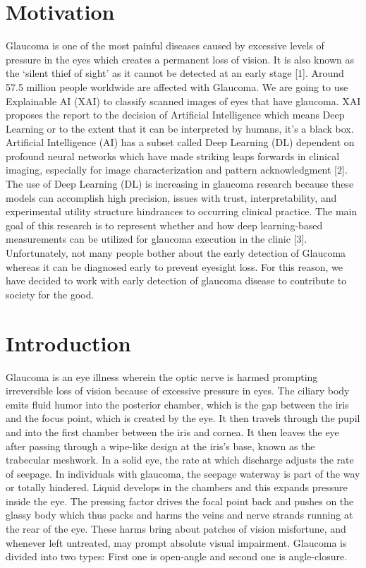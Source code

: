 \section{Motivation} 
Glaucoma is one of the most painful diseases caused by excessive levels of pressure in the eyes which creates a permanent loss of vision. It is also known as the ‘silent thief of sight’ as it cannot be detected at an early stage [1]. Around 57.5 million people worldwide are affected with Glaucoma. We are going to use Explainable AI (XAI) to classify scanned images of eyes that have glaucoma. XAI proposes the report to the decision of Artificial Intelligence which means Deep Learning or to the extent that it can be interpreted by humans, it's a black box. Artificial Intelligence (AI) has a subset called Deep Learning (DL) dependent on profound neural networks which have made striking leaps forwards in clinical imaging, especially for image characterization and pattern acknowledgment [2]. The use of Deep Learning (DL) is increasing in glaucoma research because these models can accomplish high precision, issues with trust, interpretability, and experimental utility structure hindrances to occurring clinical practice. The main goal of this research is to represent whether and how deep learning-based measurements can be utilized for glaucoma execution in the clinic [3]. Unfortunately, not many people bother about the early detection of Glaucoma whereas it can be diagnosed early to prevent eyesight loss. For this reason, we have decided to work with early detection of glaucoma disease to contribute to society for the good.

\section{Introduction}
Glaucoma is an eye illness wherein the optic nerve is harmed prompting irreversible loss of vision because of excessive pressure in eyes. The ciliary body emits fluid humor into the posterior chamber, which is the gap between the iris and the focus point, which is created by the eye. It then travels through the pupil and into the first chamber between the iris and cornea. It then leaves the eye after passing through a wipe-like design at the iris's base, known as the trabecular meshwork. In a solid eye, the rate at which discharge adjusts the rate of seepage. In individuals with glaucoma, the seepage waterway is part of the way or totally hindered. Liquid develops in the chambers and this expands pressure inside the eye. The pressing factor drives the focal point back and pushes on the glassy body which thus packs and harms the veins and nerve strands running at the rear of the eye. These harms bring about patches of vision misfortune, and whenever left untreated, may prompt absolute visual impairment. Glaucoma is divided into two types: First one is open-angle and second one is angle-closure.

